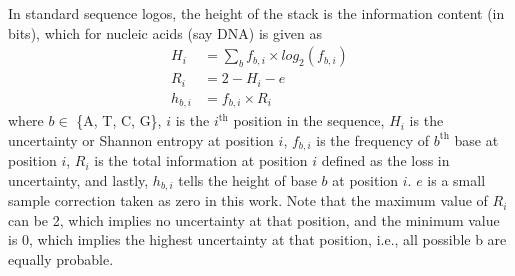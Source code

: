 In standard sequence logos, the height of the stack is the information content (in bits), which for nucleic acids (say DNA) is given as 
\begin{equation}
    \begin{split}
    H_i     &= \sum_{b}f_{b,i} \times log_2(f_{b,i}) \\
    R_i     &= 2 - H_i - e \\
    h_{b,i} &= f_{b,i} \times R_i
    \end{split}
\end{equation}
where $b \in$ \{A, T, C, G\}, $i$ is the $i^{\text{th}}$ position in the sequence, $H_i$ is the uncertainty or Shannon entropy at position $i$, $f_{b,i}$ is the frequency of $b^{\text{th}}$ base at position $i$, $R_i$ is the total information at position $i$ defined as the loss in uncertainty, and lastly, $h_{b,i}$ tells the height of base $b$ at position $i$. 
$e$ is a small sample correction taken as zero in this work. Note that the maximum value of $R_i$ can be 2, which implies no uncertainty at that position, and the minimum value is 0, which implies the highest uncertainty at that position, i.e., all possible b are equally probable. 


